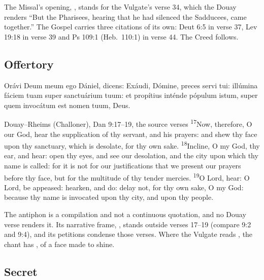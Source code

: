 \noindent The Missal's opening, ,
stands for the Vulgate's verse 34, which the Douay renders ``But the
Pharisees, hearing that he had silenced the Sadducees, came together.'' The
Gospel carries three citations of its own: Deut 6:5 in verse 37, Lev 19:18 in
verse 39 and Ps 109:1 (Heb.\ 110:1) in verse 44. The Creed follows.

\subsection{Offertory}
\label{proper-offertory}


\begin{latinproper}
Orávi Deum meum ego Dániel, dicens: Exáudi, Dómine, preces servi tui:
illúmina fáciem tuam super sanctuárium tuum: et propítius inténde pópulum
istum, super quem invocátum est nomen tuum, Deus.
\end{latinproper}

\begin{englishwitness}{Douay--Rheims (Challoner), Dan 9:17--19, the source verses}
\textsuperscript{17}Now, therefore, O our God, hear the supplication of thy
servant, and his prayers: and shew thy face upon thy sanctuary, which is
desolate, for thy own sake. \textsuperscript{18}Incline, O my God, thy ear, and
hear: open thy eyes, and see our desolation, and the city upon which thy name
is called: for it is not for our justifications that we present our prayers
before thy face, but for the multitude of thy tender mercies.
\textsuperscript{19}O Lord, hear: O Lord, be appeased: hearken, and do: delay
not, for thy own sake, O my God: because thy name is invocated upon thy city,
and upon thy people.
\end{englishwitness}

\noindent The antiphon is a compilation and not a continuous quotation, and no Douay
verse renders it. Its narrative frame, , stands outside verses 17--19 (compare 9:2 and 9:4), and its petitions
condense those verses. Where the Vulgate reads ,
the chant has , of a face made to shine.

\subsection{Secret}
\label{proper-secret}

